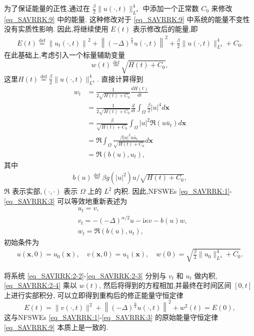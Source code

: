 为了保证能量的正性,通过在 $\frac{\beta}{2}\|u(\cdot, t)\|_{L^{4}}^{4}$ 中添加一个正常数 $C_0$ 来修改 \eqref{eq_SAVRRK:9} 中的能量.
这种修改对于 \eqref{eq_SAVRRK:9} 中系统的能量不变性没有实质性影响.
因此,将继续使用 $E(t)$ 表示修改后的能量,即
\begin{align}\label{eq_SAVRRK:9_1}
	E(t)\overset{\text{def}}{=}\left\|u_{t}(\cdot, t)\right\|^{2}+\left\|(-\Delta)^{\frac{\alpha}{4}} u(\cdot, t)\right\|^{2}+\frac{\beta}{2}\|u(\cdot, t)\|_{L^{4}}^{4} + C_0.
\end{align}
在此基础上,考虑引入一个标量辅助变量
\begin{equation}
	w(t)\overset{\text{def}}{=}\sqrt{H(t)+C_0},
\end{equation}
这里$H(t)\overset{\text{def}}{=}\frac{\beta}{2}\|u(\cdot, t)\|_{L^{4}}^{4} .$
直接计算得到
\begin{align}
	w_t & =\frac{1}{2 \sqrt{H(t)+C_0}} \frac{d H(t)}{d t} \nonumber\\
	& =\frac{1}{2 \sqrt{H(t)+C_0}} \frac{d}{d t} \int_{\Omega} \frac{\beta}{2}|u|^{4}d \boldsymbol{x} \nonumber\\
	& =\frac{\beta}{\sqrt{H(t)+C_0}} \int_{\Omega} |u|^2 \Re\left(u \bar{u}_t\right) d \boldsymbol{x}\nonumber\\
	& =\Re \int_{\Omega} \frac{\beta|u|^2 u \bar{u}_t}{\sqrt{H(t)+C_0}} d \boldsymbol{x} \nonumber\\
	& =\Re\left(b(u), u_t\right), \label{eq_SAVRRK:2-1}
\end{align}
其中
\begin{align}
b(u)\overset{\text{def}}{=}\beta g(|u|^2) u / \sqrt{H(t)+C_0},
\end{align}
$\Re$ 表示实部,$(\cdot, \cdot)$ 表示 $\Omega$ 上的 $L^2$ 内积.
因此,NFSWEs \eqref{eq_SAVRRK:1}-\eqref{eq_SAVRRK:3} 可以等效地重新表述为
\begin{align}
& u_t=v, \label{eq_SAVRRK:2-2}\\
& v_t=-(-\Delta)^{\alpha / 2} u-\mathrm{i}\kappa v-b(u) w, \label{eq_SAVRRK:2-3}\\
& w_t=\Re\left(b(u), u_t\right),\label{eq_SAVRRK:2-4}
\end{align}
初始条件为
\begin{align}\label{eq_SAVRRK:31}
	u(\boldsymbol{x}, 0)=u_{0}(\boldsymbol{x}), \quad v(\boldsymbol{x}, 0)=u_{1}(\boldsymbol{x}), \quad w(0)=\sqrt{\frac{\beta}{2}\|u_{0}\|_{L^{4}}^{4} +C_0}.
\end{align}

将系统 \eqref{eq_SAVRRK:2-2}-\eqref{eq_SAVRRK:2-3} 分别与 $v_t$ 和 $u_t$ 做内积, \eqref{eq_SAVRRK:2-4} 乘以 $w(t)$, 然后将得到的方程相加,并最终在时间区间 $[0, t]$ 上进行实部积分,
可以立即得到重构后的修正能量守恒定律
\begin{equation}
E(t)=\|v(\cdot, t)\|^2+\left\|(-\Delta)^{\frac{\alpha}{4}} u(\cdot, t)\right\|^{2}+w^2(t)=E(0),
\end{equation}
这与NFSWEs \eqref{eq_SAVRRK:1}-\eqref{eq_SAVRRK:3} 的原始能量守恒定律 \eqref{eq_SAVRRK:9} 本质上是一致的.

